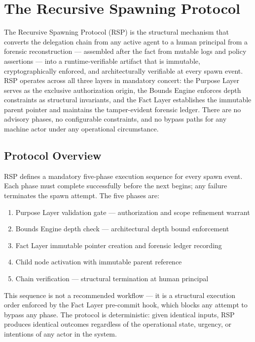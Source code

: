 \section{The Recursive Spawning Protocol}
\label{sec:rs-protocol}

The Recursive Spawning Protocol (RSP) is the structural mechanism that converts the delegation chain from any active agent to a human principal from a forensic reconstruction — assembled after the fact from mutable logs and policy assertions — into a runtime-verifiable artifact that is immutable, cryptographically enforced, and architecturally verifiable at every spawn event. RSP operates across all three \bxthree{} layers in mandatory concert: the Purpose Layer serves as the exclusive authorization origin, the Bounds Engine enforces depth constraints as structural invariants, and the Fact Layer establishes the immutable parent pointer and maintains the tamper-evident forensic ledger. There are no advisory phases, no configurable constraints, and no bypass paths for any machine actor under any operational circumstance.

\subsection{Protocol Overview}
\label{sec:rs-overview}

RSP defines a mandatory five-phase execution sequence for every spawn event. Each phase must complete successfully before the next begins; any failure terminates the spawn attempt. The five phases are:

\begin{enumerate}
    \item Purpose Layer validation gate — authorization and scope refinement warrant
    \item Bounds Engine depth check — architectural depth bound enforcement
    \item Fact Layer immutable pointer creation and forensic ledger recording
    \item Child node activation with immutable parent reference
    \item Chain verification — structural termination at human principal
\end{enumerate}

This sequence is not a recommended workflow — it is a structural execution order enforced by the Fact Layer pre-commit hook, which blocks any attempt to bypass any phase. The protocol is deterministic: given identical inputs, RSP produces identical outcomes regardless of the operational state, urgency, or intentions of any actor in the system.

